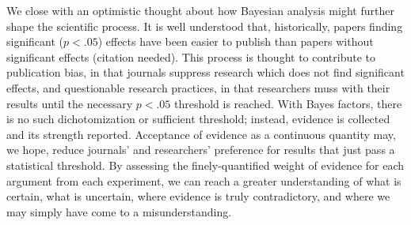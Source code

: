 \documentclass[fignum,nobf,man]{apa}
\begin{document}
We close with an optimistic thought about how Bayesian analysis might further shape the scientific process. It is well understood that, historically, papers finding significant ($p < .05$) effects have been easier to publish than papers without significant effects (citation needed). This process is thought to contribute to publication bias, in that journals suppress research which does not find significant effects, and questionable research practices, in that researchers muss with their results until the necessary $p < .05$ threshold is reached. %
With Bayes factors, there is no such dichotomization or sufficient threshold; instead, evidence is collected and its strength reported. Acceptance of evidence as a continuous quantity may, we hope, reduce journals' and researchers' preference for results that just pass a statistical threshold. By assessing the finely-quantified weight of evidence for each argument from each experiment, we can reach a greater understanding of what is certain, what is uncertain, where evidence is truly contradictory, and where we may simply have come to a misunderstanding.


\newpage

\end{document}
